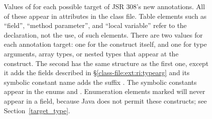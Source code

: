 \documentclass[10pt]{article}
\begin{document}
\begin{figure}[thp!]
\begin{center}
\begin{tabular}{|l|l|c|c|}
\hline
\end{tabular}
\end{center}
\vspace{-10pt}
\caption{\label{tbl:target_types}
  Values of  for each possible target of JSR 308's new
  annotations.  All of these appear in \extendedannotation attributes
  in the class file.
  Table elements such as ``field'', ``method parameter'', and ``local
  variable'' refer to the declaration, not the use, of such elements.
\newline
  There are two  values for each annotation target:  one
  for the construct itself, and one for type arguments, array types, or
  nested types that appear at the construct.  The second
   has the same structure as the first one, except it
  adds the fields described in \S\ref{class-file:ext:ri:typearg} and its
  symbolic constant name adds the suffix .
  The symbolic constants appear in the enums
   and
  .
\newline
  Enumeration elements marked \unused{} will never appear in a
   field, because Java does not permit these constructs;
  see Section~\ref{target_type}.
}
\end{figure}


\end{document}
